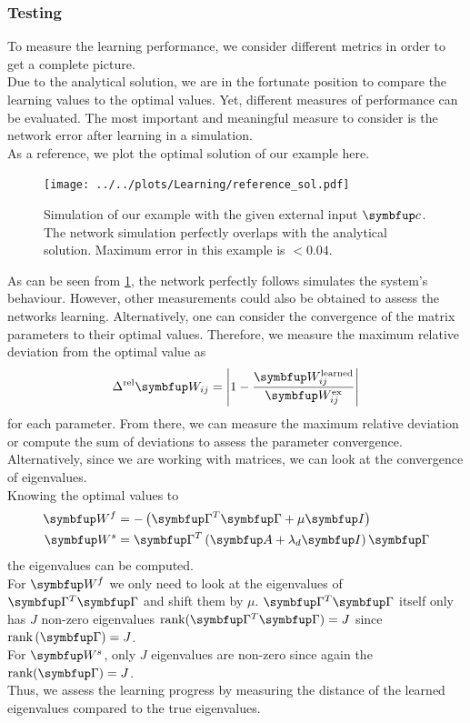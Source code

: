 \subsubsection{Testing}
To measure the learning performance, we consider different metrics in order to get a complete picture.\\
Due to the analytical solution, we are in the fortunate position to compare the learning values to the optimal values. Yet, different measures of performance can be evaluated. The most important and meaningful measure to consider is the network error after learning in a simulation.\\
As a reference, we plot the optimal solution of our example here.
\begin{figure}
	\centering
	\texttt{[image: ../../plots/Learning/reference\_sol.pdf]}
	\caption{Simulation of our example with the given external input $\bmu{c}$. The network simulation perfectly overlaps with the analytical solution. Maximum error in this example is $<0.04$.}
	\label{fig:reference_sol}
\end{figure}
As can be seen from \cref{fig:reference_sol}, the network perfectly follows simulates the system's behaviour. However, other measurements could also be obtained to assess the networks learning. Alternatively, one can consider the convergence of the matrix parameters to their optimal values. Therefore, we measure the maximum relative deviation from the optimal value as
\begin{equation}\label{eq:largest_rel_dev}
	\Delta^\text{rel} \bmu{W}_{ij} =\left|1 - \frac{\bmu{W}^{\text{learned}}_{ij}}{\bmu{W}^\text{ex}_{ij}}\right|
\end{equation}
for each parameter. From there, we can measure the maximum relative deviation or compute the sum of deviations to assess the parameter convergence.\\
Alternatively, since we are working with matrices, we can look at the convergence of eigenvalues.\\
Knowing the optimal values to
\begin{equation}
\begin{aligned}
	\bmu{W}^f &= -\left(\bmu{\Gamma}^T\bmu{\Gamma} + \mu \bmu{I}\right)\\
	\bmu{W}^s &= \bmu{\Gamma}^T\left(\bmu{A} + \lambda_d\bmu{I}\right)\bmu{\Gamma}\\
\end{aligned}
\end{equation}
the eigenvalues can be computed.\\
For $\bmu{W}^f$ we only need to look at the eigenvalues of $\bmu{\Gamma}^T\bmu{\Gamma}$ and shift them by $\mu$. $\bmu{\Gamma}^T\bmu{\Gamma}$ itself only has $J$ non-zero eigenvalues $\text{rank}(\bmu{\Gamma}^T\bmu{\Gamma}) = J$ since $\text{rank}\left(
\bmu{\Gamma}\right) = J$.\\
For $\bmu{W}^s$, only $J$ eigenvalues are non-zero since again the $\text{rank}(\bmu{\Gamma}) = J$.\\
Thus, we assess the learning progress by measuring the distance of the learned eigenvalues compared to the true eigenvalues.\\


